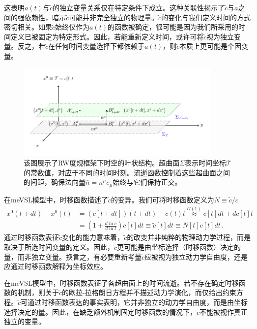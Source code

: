 \documentclass[jkps,preprint,fleqn]{revtex4}
\newcommand{\tc}{\tilde{c}}
\begin{document}
\begin{CJK*}{UTF8}{gbsn}
这表明$a(t)$与$\tc$的独立变量关系仅在特定条件下成立。这种关联性揭示了$\tc$与$a$之间的强依赖性，暗示$\tc$可能并非完全独立的物理量。$\tc$的变化与我们定义时间的方式密切相关。如果$\tc$始终仅作为$a(t)$的函数被确定，很可能是因为我们所采用的时间定义已被固定为特定形式。因此，若能重新定义时间，或许可将$\tc$视为独立变量。反之，若$\tc$在任何时间变量选择下都依赖于$a(t)$，则$\tc$本质上更可能是个因变量。

\begin{figure}
	\begin{center}
	\includegraphics[width=0.9\textwidth]{Fig2.pdf}
	\caption{该图展示了RW度规框架下时空的叶状结构。超曲面$\Sigma$表示时间坐标$\mathcal{T}$的常数值，对应于不同的时间时刻。流逝函数控制着这些超曲面之间的间距，确保法向量$\bar{n} = n^{\mu} e_{\mu}$始终与它们保持正交。}
	\label{Fig2}
	\end{center}
\end{figure}

在meVSL模型中，时移函数描述了$\tc$的变异。我们可将时移函数定义为$N \equiv \tc/c$
\begin{align}
x^{0}(t+dt) - x^{0}(t) &=  \left( c[t+dt] \right) \left( t+dt \right) - c(t) t \overset{\mathcal{O}(1)}{\approx} c[t] dt + dc[t] t \nonumber \\
	&= \left( 1 + \frac{d \ln c}{d \ln t} \right) c[t] dt \equiv \tilde{c}[t] dt \equiv N[t] c[t] dt \label{NmeVSL} \,.
\end{align}
通过时移函数表征$\tc$变化的能力意味着，$\tc$的改变并非纯粹的物理动力学过程，而是取决于所选时间变量的定义。因此，$\tc$更可能是由坐标选择（时移函数）决定的量，而非独立变量。换言之，有必要重新考量$\tc$应被视为独立动力学自由度，还是应通过时移函数解释为坐标效应。

在meVSL模型中，时移函数表征了各超曲面上的时间流逝。若不存在确定时移函数的机制，则关于$\tc$的欧拉-拉格朗日方程并不描述动力学演化，而仅给出约束方程。$\tc$可通过时移函数表达的事实表明，它并非独立的动力学自由度，而是由坐标选择决定的量。因此，在缺乏额外机制固定时移函数的情况下，$\tc$不能被视作真正独立的变量。


\end{CJK*}
\end{document}

